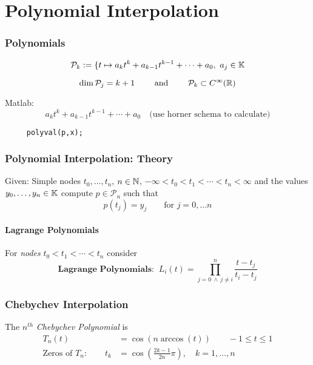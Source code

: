 \part{Polynomial Interpolation}

\section{Polynomials}
	\[
	 \mathcal P_k := \{ t\mapsto a_k t^k + a_{k-1} t^{k-1} + \cdots + a_0, \ a_j \in \mathbb{K}
	\]

	\begin{theorem}
	 \[
	  \dim \mathcal P_j = k+1 \qquad \text{ and } \qquad \mathcal P_k \subset C^\infty (\mathbb{R})
	 \]
	\end{theorem}
	
	Matlab:
	\[
	 a_k t^k + a_{k-1} t^{k-1} + \cdots + a_0 \quad \text{(use horner schema to calculate)}
	\]
	\begin{lstlisting}
	 polyval(p,x);
	\end{lstlisting}
\section{Polynomial Interpolation: Theory}
	Given: Simple nodes $t_0, \ldots, t_n$, $n \in \mathbb{N}$, $-\infty < t_0 < t_1 < \cdots < t_n < \infty$ and the values $y_0, \ldots, y_n \in \mathbb{K}$ compute $p \in \mathcal P_n$ such that
		\[
		 p(t_j) = y_j \qquad \text{for }j=0, \ldots n
		\]

	\subsection{Lagrange Polynomials}
		For \emph{nodes} $t_0 < t_1 < \cdots < t_n$ consider
		\[
		 \textbf{Lagrange Polynomials: }\ L_i (t) = \prod_{j=0\ \land \ j \neq i}^n \frac{t-t_j}{t_i-t_j}
		\]

\section{Chebychev Interpolation}
	\begin{definition}
	 The $n^{th}$ \emph{Chebychev Polynomial} is 
	 \begin{align*}
		T_n (t) &= \cos(n \arccos(t)) \qquad -1 \leq t \leq 1\\
		\text{Zeros of }T_n: \qquad t_k &= \cos \left( \frac{2k-1}{2n}\pi\right),\quad k=1, \ldots, n	  
	 \end{align*}
	\end{definition}
	
